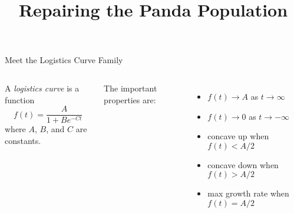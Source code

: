 \documentclass[10pt,aspectratio=1610,xcolor={dvipsnames}]{beamer}
\title{Repairing the Panda Population}
\begin{document}
  \begin{frame}
    \titlepage
  \end{frame}

  \begin{frame}{Meet the Logistics Curve Family}

    \begin{center}
      \scalebox{0.75}{}
    \end{center}

    \begin{columns}

      \begin{center}
        A \emph{logistics curve} is a function
        \[
          f(t) = \frac{A}{1 + Be^{-Ct}}
        \]
        where $A$, $B$, and $C$ are constants.
      \end{center}

      The important properties are:

      \begin{itemize}
        \item{$f(t) \to A$ as $t \to \infty$}
        \item{$f(t) \to 0$ as $t \to -\infty$}
        \item{concave up when $f(t) < A / 2$}
        \item{concave down when $f(t) > A / 2$}
        \item{max growth rate when $f(t) = A / 2$}
      \end{itemize}

    \end{columns}

  \end{frame}
\end{document}
